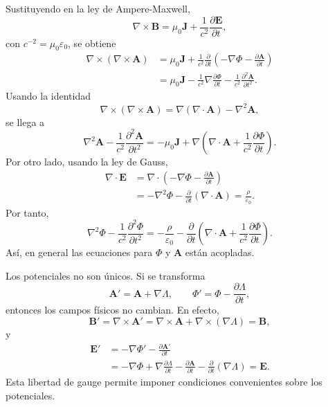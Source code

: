 \documentclass[11pt]{article}
\newcommand{\vb}[1]{\mathbf{#1}}
\begin{document}
Sustituyendo en la ley de Ampere-Maxwell,
\begin{equation}
  \nabla\times\vb B
  =
  \mu_0\vb J
  +
  \frac{1}{c^2}\frac{\partial\vb E}{\partial t},
\end{equation}
con $c^{-2}=\mu_0\varepsilon_0$, se obtiene
\begin{align}
  \nabla\times(\nabla\times\vb A)
  &=
  \mu_0\vb J
  +
  \frac{1}{c^2}
  \frac{\partial}{\partial t}
  \left(
  -\nabla\Phi-\frac{\partial\vb A}{\partial t}
  \right)\\
  &=
  \mu_0\vb J
  -
  \frac{1}{c^2}
  \nabla\frac{\partial\Phi}{\partial t}
  -
  \frac{1}{c^2}
  \frac{\partial^2\vb A}{\partial t^2}.
\end{align}
Usando la identidad
\begin{equation}
  \nabla\times(\nabla\times\vb A)
  =
  \nabla(\nabla\cdot\vb A)-\nabla^2\vb A,
\end{equation}
se llega a
\begin{equation}
  \nabla^2\vb A
  -
  \frac{1}{c^2}
  \frac{\partial^2\vb A}{\partial t^2}
  =
  -\mu_0\vb J
  +
  \nabla
  \left(
  \nabla\cdot\vb A
  +
  \frac{1}{c^2}\frac{\partial\Phi}{\partial t}
  \right).
\end{equation}
Por otro lado, usando la ley de Gauss,
\begin{align}
  \nabla\cdot\vb E
  &=
  \nabla\cdot
  \left(
  -\nabla\Phi-\frac{\partial\vb A}{\partial t}
  \right)\\
  &=
  -\nabla^2\Phi
  -
  \frac{\partial}{\partial t}
  (\nabla\cdot\vb A)
  =
  \frac{\rho}{\varepsilon_0}.
\end{align}
Por tanto,
\begin{equation}
  \nabla^2\Phi
  -
  \frac{1}{c^2}
  \frac{\partial^2\Phi}{\partial t^2}
  =
  -\frac{\rho}{\varepsilon_0}
  -
  \frac{\partial}{\partial t}
  \left(
  \nabla\cdot\vb A
  +
  \frac{1}{c^2}
  \frac{\partial\Phi}{\partial t}
  \right).
\end{equation}
As\'i, en general las ecuaciones para $\Phi$ y $\vb A$ est\'an acopladas.

Los potenciales no son \'unicos. Si se transforma
\begin{equation}
  \vb A'=\vb A+\nabla\Lambda,
  \qquad
  \Phi'=\Phi-\frac{\partial\Lambda}{\partial t},
\end{equation}
entonces los campos f\'isicos no cambian. En efecto,
\begin{equation}
  \vb B'
  =
  \nabla\times\vb A'
  =
  \nabla\times\vb A+\nabla\times(\nabla\Lambda)
  =
  \vb B,
\end{equation}
y
\begin{align}
  \vb E'
  &=
  -\nabla\Phi'
  -
  \frac{\partial\vb A'}{\partial t}\\
  &=
  -\nabla\Phi
  +
  \nabla\frac{\partial\Lambda}{\partial t}
  -
  \frac{\partial\vb A}{\partial t}
  -
  \frac{\partial}{\partial t}(\nabla\Lambda)
  =
  \vb E.
\end{align}
Esta libertad de gauge permite imponer condiciones convenientes sobre los
potenciales.
\end{document}
